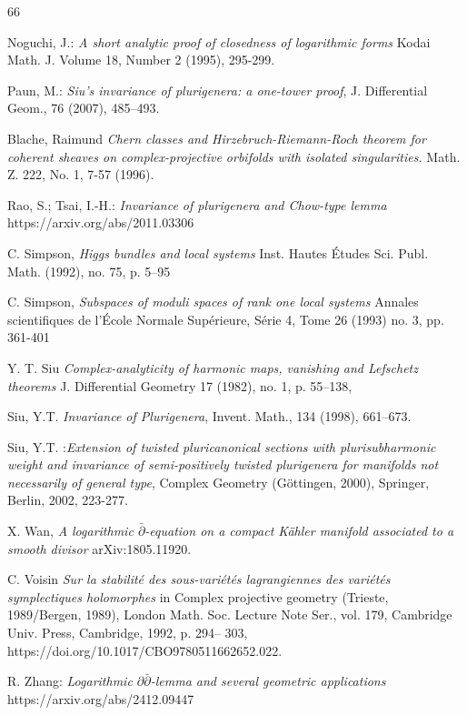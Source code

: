 \documentclass[english]{amsart}
\newcommand{\ddbar}{\partial\bar{\partial}}
\newcommand{\dbar}{\bar \partial}
\numberwithin{equation}{thm}
\begin{document}
\begin{thebibliography}{66}
		
		  Noguchi, J.:{\em 
			A short analytic proof of closedness of logarithmic forms} Kodai Math. J.
		Volume 18, Number 2 (1995), 295-299.
		
		  Paun, M.: {\em Siu’s invariance of plurigenera: a one-tower proof}, J. Differential Geom., 76 (2007), 485–493.
		
		Blache, Raimund
		{\em Chern classes and Hirzebruch-Riemann-Roch theorem for coherent sheaves on complex-projective orbifolds with isolated singularities. }
		Math. Z. 222, No. 1, 7-57 (1996).
		
		 Rao, S.; Tsai, I.-H.: {\em Invariance of plurigenera and Chow-type lemma}
		https://arxiv.org/abs/2011.03306
		
			
			C. Simpson,	{\em Higgs bundles and local systems} Inst. Hautes Études Sci. Publ. Math.
		(1992), no. 75, p. 5–95
		
			C. Simpson, {\em 
		Subspaces of moduli spaces of rank one local systems}
		Annales scientifiques de l'École Normale Supérieure, Série 4, Tome 26 (1993) no. 3, pp. 361-401
		
			Y. T. Siu {\em Complex-analyticity of harmonic maps, vanishing and Lefschetz theorems}
		J. Differential Geometry 17 (1982), no. 1, p. 55–138, 
		
		 Siu, Y.T. {\em Invariance of Plurigenera}, Invent. Math., 134 (1998), 661–673.
		
		 Siu, Y.T. :{\em Extension of twisted pluricanonical sections with plurisubharmonic weight and invariance of semi-positively twisted plurigenera for manifolds not necessarily of
			general type}, Complex Geometry (G\"ottingen, 2000), Springer, Berlin, 2002, 223-277.
		
		 	X. Wan, {\em A logarithmic $\dbar$-equation on a compact Kähler manifold associated to a smooth divisor}
		arXiv:1805.11920.
		
		 C. Voisin {\em Sur la stabilité des sous-variétés lagrangiennes des variétés symplectiques
		holomorphes} in Complex projective geometry (Trieste, 1989/Bergen, 1989), London
		Math. Soc. Lecture Note Ser., vol. 179, Cambridge Univ. Press, Cambridge, 1992, p. 294–
		303, https://doi.org/10.1017/CBO9780511662652.022. 
		
	 	R. Zhang: {\em Logarithmic $\ddbar$-lemma and several geometric applications} https://arxiv.org/abs/2412.09447
	
	
	\end{thebibliography}
	
\end{document}

